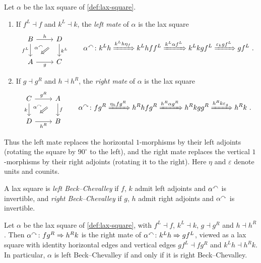 \begin{constru}[mates]
\label{constr:mates}
%
Let $\alpha$ be the lax square of \cref{def:lax-square}.
\begin{enumerate}
\item If $f^{L} \dashv f$ and $k^{L} \dashv k$,
the \emph{left mate} of $\alpha$ is the lax square
\begin{equation*}
\begin{tikzcd}
B \ar[r, "h"] \ar[d, "f^{L}"'] & D \ar[d, "k^{L}"] \ar[dl, Rightarrow,
shorten=3mm, "\lmate{\alpha}"'] \\
A \ar[r, "g"'] & C
\end{tikzcd}
\qquad
\lmate{\alpha}\colon k^{L}h \xRightarrow{k^{L}h\eta_{f}} k^{L}hff^{L}
\xRightarrow{k^{L}\alpha f^{L}} k^{L}kgf^{L} \xRightarrow{\varepsilon_{k}gf^{L}}
gf^{L} \ .
\end{equation*}
\item If $g \dashv g^{R}$ and $h \dashv h^{R}$,
the \emph{right mate} of $\alpha$ is the lax square
\begin{equation*}
\begin{tikzcd}
C \ar[r, "g^{R}"] \ar[d, "k"'] & A \ar[d, "f"] \ar[dl, Rightarrow, shorten=3mm,
"\rmate{\alpha}"'] \\
D \ar[r, "h^{R}"'] & B
\end{tikzcd}
\qquad
\rmate{\alpha}\colon fg^{R} \xRightarrow{\eta_{h}fg^{R}} h^{R}hfg^{R}
\xRightarrow{h^{R}\alpha g^{R}} h^{R}kgg^{R} \xRightarrow{h^{R}k\varepsilon_{g}}
h^{R}k \ .
\end{equation*}
\end{enumerate}
Thus the left mate replaces the horizontal $1$-morphisms by their left adjoints
(rotating the square by $90^{\circ}$ to the left),
and the right mate replaces the vertical $1$-morphisms by their right adjoints
(rotating it to the right). Here $\eta$ and $\varepsilon$ denote units and
counits.
\end{constru}

\begin{defi}
\label{def:BC}
%
A lax square is \emph{left Beck--Chevalley} if $f$,
$k$ admit left adjoints and ${\alpha}^{\curvearrowleft}$ is invertible,
and \emph{right Beck--Chevalley} if $g$,
$h$ admit right adjoints and ${\alpha}^{\curvearrowright}$ is invertible.
\end{defi}

\begin{lem}
\label{lem:mates-conjugate}
%
Let $\alpha$ be the lax square of \cref{def:lax-square}, with $f^{L} \dashv f$,
$k^{L} \dashv k$, $g \dashv g^{R}$ and $h \dashv h^{R}$. Then
${\alpha}^{\curvearrowright}\colon fg^{R} \Rightarrow h^{R}k$
is the right mate of
${\alpha}^{\curvearrowleft}\colon k^{L}h \Rightarrow gf^{L}$,
viewed as a lax square with identity horizontal edges and vertical edges $gf^{L}
\dashv fg^{R}$ and $k^{L}h \dashv h^{R}k$. In particular,
$\alpha$ is left Beck--Chevalley if and only if it is right Beck--Chevalley.
\end{lem}

